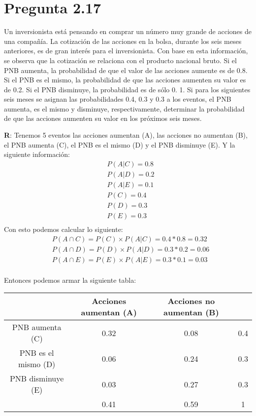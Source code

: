 \documentclass{article}
\newcommand{\prob}[1]{{P} \left( {#1} \right)}
\begin{document}
\section*{Pregunta 2.17}
Un inversionista está pensando en comprar un número muy grande de acciones de una compañía. La cotización de las acciones en la bolsa, durante los seis meses anteriores, es de gran interés para el inversionista. Con base en esta información, se observa que la cotización se relaciona con el producto nacional bruto. Si el PNB aumenta, la probabilidad de que el valor de las acciones aumente es de 0.8. Si el PNB es el mismo, la probabilidad de que las acciones aumenten su valor es de 0.2. Si el PNB disminuye, la probabilidad es de sólo 0. 1. Si para los siguientes seis meses se asignan las probabilidades 0.4, 0.3 y 0.3 a los eventos, el PNB aumenta, es el mismo y disminuye, respectivamente, determinar la probabilidad de que las acciones aumenten su valor en los próximos seis meses.

\vspace{0.4cm}

\textbf{R}: Tenemos 5 eventos las acciones aumentan (A), las acciones no aumentan (B), el PNB aumenta (C), el PNB es el mismo (D)
y el PNB disminuye (E). Y la siguiente información:
\begin{align*}
& \prob{A | C} = 0.8 \\
& \prob{A | D} = 0.2 \\
& \prob{A | E} = 0.1 \\
& \prob{C} = 0.4\\
& \prob{D} = 0.3\\
& \prob{E} = 0.3\\
\end{align*}
Con esto podemos calcular lo siguiente: 
\begin{align*}
& \prob{A \cap C} = \prob{C} \times \prob{A | C} = 0.4 * 0.8 = 0.32 \\
& \prob{A \cap D} = \prob{D} \times \prob{A | D} = 0.3 * 0.2 = 0.06 \\
& \prob{A \cap E} = \prob{E} \times \prob{A | E} = 0.3 * 0.1 = 0.03 \\
\end{align*}

Entonces podemos armar la siguiente tabla:

\begin{table}[ht]
	\begin{tabular}{|c|c|c|c|} \hline
		                     & Acciones aumentan (A) & Acciones no aumentan (B) &  \\ \hline
		PNB aumenta     (C)  & 0.32                  & 0.08   & 0.4 \\ 
		PNB es el mismo (D)  & 0.06                  & 0.24   & 0.3 \\ 
		PNB disminuye   (E)  & 0.03                  & 0.27   & 0.3 \\ \hline
		                     & 0.41                  & 0.59   & 1  \\ \hline
	\end{tabular}
\end{table}
\end{document}
